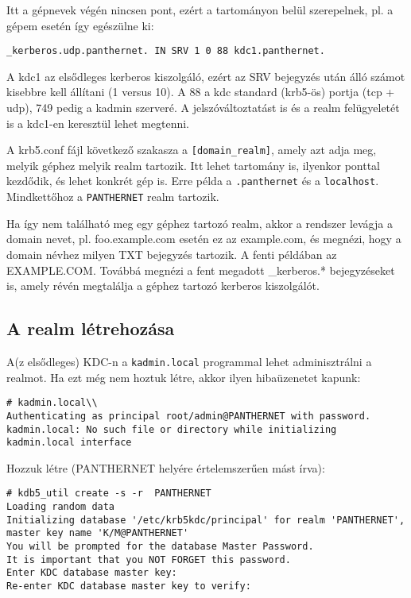 Itt a gépnevek végén nincsen pont, ezért a tartományon belül szerepelnek, pl. a gépem esetén így egészülne ki:
\begin{Verbatim}[frame=single]
_kerberos.udp.panthernet. IN SRV 1 0 88 kdc1.panthernet.
\end{Verbatim}

A kdc1 az elsődleges kerberos kiszolgáló, ezért az SRV bejegyzés után álló számot kisebbre kell állítani (1 versus
10). A 88 a kdc standard (krb5-ös) portja (tcp + udp), 749 pedig a kadmin szerveré. A jelszóváltoztatást is és a realm
felügyeletét is a kdc1-en keresztül lehet megtenni.

A krb5.conf fájl következő szakasza a \texttt{[domain\_realm]}, amely azt adja meg, melyik géphez melyik realm
tartozik. Itt lehet tartomány is, ilyenkor ponttal kezdődik, és lehet konkrét gép is. Erre példa a
\texttt{.panthernet} és a \texttt{localhost}. Mindkettőhoz a \texttt{PANTHERNET} realm tartozik.

Ha így nem található meg egy géphez tartozó realm, akkor a rendszer levágja a domain nevet, pl. foo.example.com esetén
ez az example.com, és megnézi, hogy a domain névhez milyen TXT bejegyzés tartozik. A fenti példában az
EXAMPLE.COM. Továbbá megnézi a fent megadott \_kerberos.* bejegyzéseket is, amely révén megtalálja a géphez tartozó
kerberos kiszolgálót.


\subsection{A realm létrehozása}
A(z elsődleges) KDC-n a \texttt{kadmin.local} programmal lehet adminisztrálni a realmot. Ha ezt még nem hoztuk létre,
akkor ilyen hibaüzenetet kapunk:

\begin{Verbatim}[frame=single]
# kadmin.local\\
Authenticating as principal root/admin@PANTHERNET with password.
kadmin.local: No such file or directory while initializing kadmin.local interface
\end{Verbatim}

Hozzuk létre (PANTHERNET helyére értelemszerűen mást írva):

\begin{Verbatim}[frame=single,label=realm létrehozása]
# kdb5_util create -s -r  PANTHERNET
Loading random data
Initializing database '/etc/krb5kdc/principal' for realm 'PANTHERNET',
master key name 'K/M@PANTHERNET'
You will be prompted for the database Master Password.
It is important that you NOT FORGET this password.
Enter KDC database master key:
Re-enter KDC database master key to verify:
\end{Verbatim}


